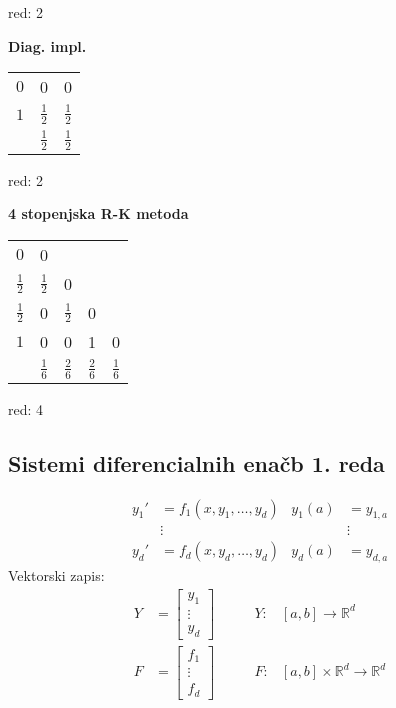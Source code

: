 \begin{multicols}{5}
\begin{multicols*}{3}
\begin{center}
\begin{tabular}[]{c | c c}
        \end{tabular}
    \end{center}
    red: 2
    
    \textbf{Diag. impl.}
    \begin{center}
        \renewcommand{\arraystretch}{1.5}
        \begin{tabular}[]{c | c c}
            $0$ & 0 & 0 \\
            $1$ & $\frac{1}{2}$ & $\frac{1}{2}$ \\ \hline
            & $\frac{1}{2}$ & $\frac{1}{2}$ \\
            
        \end{tabular}
    \end{center}
    red: 2
\end{multicols*}

\textbf{4 stopenjska R-K metoda}
\begin{center}
    \renewcommand{\arraystretch}{1.5}
    \begin{tabular}[]{c | c c c c}
        $0$ & 0 &  &  &  \\
        $\frac{1}{2}$ & $\frac{1}{2}$  & 0 &  &  \\
        $\frac{1}{2}$ & 0  & $\frac{1}{2}$  & 0 &  \\
        $1$ & 0  & 0  & 1 & 0 \\ \hline
                 & $\frac{1}{6}$ & $\frac{2}{6}$ & $\frac{2}{6}$ & $\frac{1}{6}$ \\

    \end{tabular}
\end{center}
red: 4

\subsection*{Sistemi diferencialnih enačb 1. reda}
\begin{align*}
    y_1' &= f_1(x, y_1, \dots, y_d) & y_1(a) &= y_{1,a} \\
        &\vdots                     &        &\vdots \\
    y_d' &= f_d(x, y_d, \dots, y_d) & y_d(a) &= y_{d,a}
\end{align*}
Vektorski zapis:
\begin{align*}
    Y &= \begin{bmatrix}
        y_1 \\
        \vdots \\
        y_d
    \end{bmatrix}
    &\qquad
    Y:& [a,b] \to \mathbb{R}^d \\
    F &= \begin{bmatrix}
        f_1 \\
        \vdots \\
        f_d
    \end{bmatrix}
    &\qquad
    F:& [a,b] \times \mathbb{R}^d  \to \mathbb{R}^d 
\end{align*}


\end{multicols}
